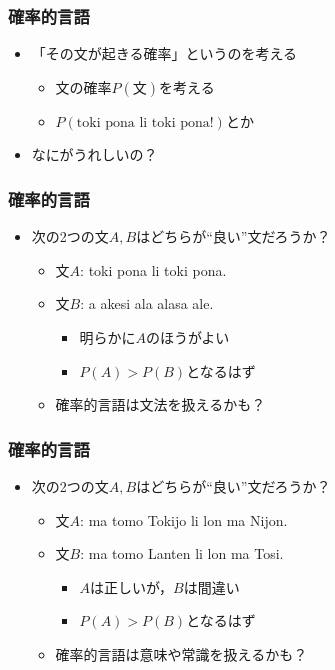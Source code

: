 \documentclass[14pt]{beamer}
\begin{document}
\begin{frame}
	\frametitle{確率的言語}

	\begin{itemize}
		\item 「その文が起きる確率」というのを考える
			\begin{itemize}
				\item 文の確率$P(\text{文})$を考える
				\item $P(\text{toki pona li toki pona!})$とか
			\end{itemize}
		\item なにがうれしいの？
	\end{itemize}
\end{frame}

\begin{frame}
	\frametitle{確率的言語}

	\begin{itemize}
		\item 次の2つの文$A, B$はどちらが``良い''文だろうか？
			\begin{itemize}
				\item 文$A$: toki pona li toki pona.
				\item 文$B$: a akesi ala alasa ale.
					\begin{itemize}
						\item 明らかに$A$のほうがよい
						\item $P(A) > P(B)$となるはず
					\end{itemize}
				\item 確率的言語は文法を扱えるかも？
			\end{itemize}
	\end{itemize}
\end{frame}

\begin{frame}
	\frametitle{確率的言語}

	\begin{itemize}
		\item 次の2つの文$A, B$はどちらが``良い''文だろうか？
			\begin{itemize}
				\item 文$A$: ma tomo Tokijo li lon ma Nijon.
				\item 文$B$: ma tomo Lanten li lon ma Tosi.
					\begin{itemize}
						\item $A$は正しいが，$B$は間違い
						\item $P(A) > P(B)$となるはず
					\end{itemize}
				\item 確率的言語は意味や常識を扱えるかも？
			\end{itemize}
	\end{itemize}
\end{frame}
\end{document}
